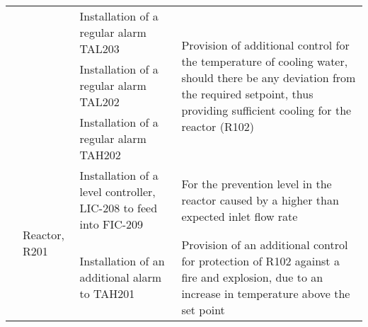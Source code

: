 \begin{table}[h]
\begin{tabular}{@{}llll@{}}
     &                                            & Installation of a regular alarm TAL203                                                                                                                        & \multirow{3}{*}{Provision of additional control for the temperature of cooling water, should there be any deviation from the required setpoint, thus providing sufficient cooling for the reactor (R102)} \\ \cmidrule(lr){3-3}
     &                                            & Installation of a regular alarm TAL202                                                                                                                        &                                                                                                                                                                                                                                                         \\
     &                                            & Installation of a regular alarm TAH202                                                                                                                        &                                                                                                                                                                                                                                                         \\ \cmidrule(l){2-4} 
     & \multirow{5}{*}{Reactor, R201}             & \multirow{2}{*}{Installation of a level controller, LIC-208 to feed into FIC-209}                                                                             & \multirow{2}{*}{For the prevention level in the reactor caused by a higher than expected inlet flow rate}                                                                                                     \\
     &                                            &                                                                                                                                                               &                                                                                                                                                                                                                                                         \\ \cmidrule(l){3-4} 
     &                                            & \multirow{2}{*}{Installation of an additional alarm to TAH201}                                                                                                & \multirow{2}{*}{Provision of an additional control for protection of R102 against a fire and explosion, due to an increase in temperature above the set point}                                           \\

\end{tabular}
\end{table}
